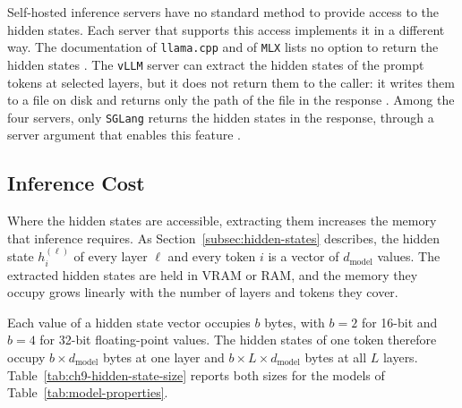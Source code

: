 Self-hosted inference servers have no standard method to provide access to the hidden states. Each server that supports this access implements it in a different way. The documentation of \texttt{llama.cpp} and of \texttt{MLX} lists no option to return the hidden states \cite{LlamacppToolsServer, MlxlmMlx_lmSERVERmd}. The \texttt{vLLM} server can extract the hidden states of the prompt tokens at selected layers, but it does not return them to the caller: it writes them to a file on disk and returns only the path of the file in the response \cite{teamExtractingHiddenStates2026}. Among the four servers, only \texttt{SGLang} returns the hidden states in the response, through a server argument that enables this feature \cite{ServerArguments}.

\subsection{Inference Cost}
\label{subsec:ch9-flag-cost}

Where the hidden states are accessible, extracting them increases the memory that inference requires. As Section~\ref{subsec:hidden-states} describes, the hidden state $h^{(\ell)}_i$ of every layer $\ell$ and every token $i$ is a vector of $d_{\mathrm{model}}$ values. The extracted hidden states are held in VRAM or RAM, and the memory they occupy grows linearly with the number of layers and tokens they cover.

Each value of a hidden state vector occupies $b$ bytes, with $b = 2$ for 16-bit and $b = 4$ for 32-bit floating-point values. The hidden states of one token therefore occupy $b \times d_{\mathrm{model}}$ bytes at one layer and $b \times L \times d_{\mathrm{model}}$ bytes at all $L$ layers. Table~\ref{tab:ch9-hidden-state-size} reports both sizes for the models of Table~\ref{tab:model-properties}.

